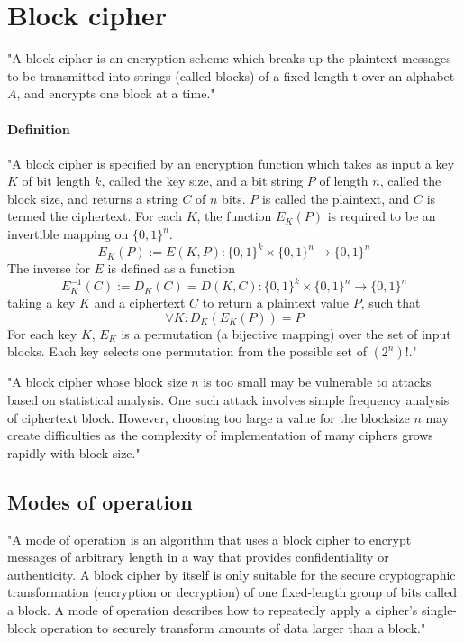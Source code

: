 \documentclass[a4paper,12pt,titlepage]{article}
\begin{document}
\section{Block cipher}

"A block cipher is an encryption scheme which breaks up the plaintext messages to be transmitted into strings (called blocks) of a fixed length t over an alphabet $A$, and encrypts one block at a time." \citep{menezes_handbook_1996}

\paragraph{Definition}
"A block cipher is specified by an encryption function which takes as input a key $K$ of bit length $k$, called the key size, and a bit string $P$ of length $n$, called the block size, and returns a string $C$ of $n$ bits. $P$ is called the plaintext, and $C$ is termed the ciphertext. For each $K$, the function $E_K(P)$ is required to be an invertible mapping on $\{0,1\}^{n}$.
$$
E_K(P) := E(K,P): \{0,1\}^k \times \{0,1\}^n \rightarrow \{0,1\}^n
$$
The inverse for $E$ is defined as a function
$$
E_K^{-1}(C) := D_K(C) = D(K,C): \{0,1\}^k \times \{0,1\}^n \rightarrow \{0,1\}^n
$$
taking a key $K$ and a ciphertext $C$ to return a plaintext value $P$, such that
$$
\forall K: D_K(E_K(P)) = P
$$
For each key $K$, $E_K$ is a permutation (a bijective mapping) over the set of input blocks. Each key selects one permutation from the possible set of $(2^n)!$." \citep{wiki:block-cipher}

"A block cipher whose block size $n$ is too small may be vulnerable to attacks based on statistical analysis. One such attack involves simple frequency analysis of ciphertext block. However, choosing too large a value for the blocksize $n$ may create difficulties as the complexity of implementation of many ciphers grows rapidly with block size." \citep{menezes_handbook_1996}

\subsection{Modes of operation}

"A mode of operation is an algorithm that uses a block cipher to encrypt messages of arbitrary length in a way that provides confidentiality or authenticity. A block cipher by itself is only suitable for the secure cryptographic transformation (encryption or decryption) of one fixed-length group of bits called a block. A mode of operation describes how to repeatedly apply a cipher's single-block operation to securely transform amounts of data larger than a block." \citep{wiki:mode-operation}
\end{document}
